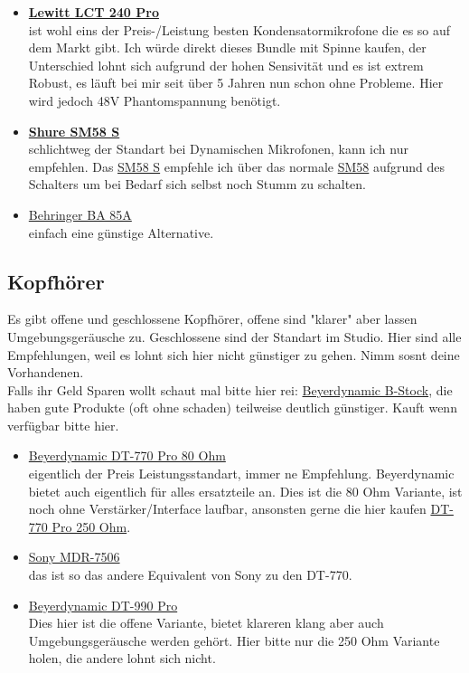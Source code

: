 \begin{itemize}
    \item \textbf{\href{https://www.thomann.de/de/lewitt_lct_240_pro_bk_bundle.htm}{Lewitt LCT 240 Pro}}\\    ist wohl eins der Preis-/Leistung besten Kondensatormikrofone die es so auf dem Markt gibt. Ich würde direkt dieses Bundle mit Spinne kaufen, der Unterschied lohnt sich aufgrund der hohen Sensivität und es ist extrem Robust, es läuft bei mir seit über 5 Jahren nun schon ohne Probleme. Hier wird jedoch 48V Phantomspannung benötigt. 
    \item \textbf{\href{https://www.thomann.de/de/shure_sm58s.htm}{Shure SM58 S}}\\ schlichtweg der Standart bei Dynamischen Mikrofonen, kann ich nur empfehlen. Das \href{https://www.thomann.de/de/shure_sm58s.htm}{SM58 S} empfehle ich über das normale \href{https://www.thomann.de/de/shure_sm58.htm}{SM58} aufgrund des Schalters um bei Bedarf sich selbst noch Stumm zu schalten. 
    \item \href{https://www.thomann.de/de/behringer_ba_85a.htm}{Behringer BA 85A} \\ einfach eine günstige Alternative.

\end{itemize}


\subsection{Kopfhörer}
Es gibt offene und geschlossene Kopfhörer, offene sind "klarer" aber lassen Umgebungsgeräusche zu. Geschlossene sind der Standart im Studio. Hier sind alle Empfehlungen, weil es lohnt sich hier nicht günstiger zu gehen. Nimm sosnt deine Vorhandenen. \\Falls ihr Geld Sparen wollt schaut mal bitte hier rei: \href{https://www.beyerdynamic.de/outlet.html?gad_source=1&gclid=Cj0KCQjwiuC2BhDSARIsALOVfBJ6sfr7q1aL37ZvTAGywnzx0hW6F8qXNQv-qk8qNju73Reqe1Cvn0AaAgraEALw_wcB}{Beyerdynamic B-Stock}, die haben gute Produkte (oft ohne schaden) teilweise deutlich günstiger. Kauft wenn verfügbar bitte hier.
\begin{itemize}
    \item \href{https://www.thomann.de/de/beyerdynamic_dt770_pro80_ohm.htm}{Beyerdynamic DT-770 Pro 80 Ohm}\\ eigentlich der Preis Leistungsstandart, immer ne Empfehlung. Beyerdynamic bietet auch eigentlich für alles ersatzteile an. Dies ist die 80 Ohm Variante, ist noch ohne Verstärker/Interface laufbar, ansonsten gerne die hier kaufen \href{https://www.thomann.de/de/beyerdynamic_dt770pro.htm}{DT-770 Pro 250 Ohm}.
    \item \href{https://www.thomann.de/de/sony_mdr7506_kopfhoerer.htm}{Sony MDR-7506}\\ das ist so das andere Equivalent von Sony zu den DT-770. 
    \item \href{https://www.thomann.de/de/beyerdynamic_dt990pro.htm}{Beyerdynamic DT-990 Pro} \\ Dies hier ist die offene Variante, bietet klareren klang aber auch Umgebungsgeräusche werden gehört. Hier bitte nur die 250 Ohm Variante holen, die andere lohnt sich nicht. 
\end{itemize}

